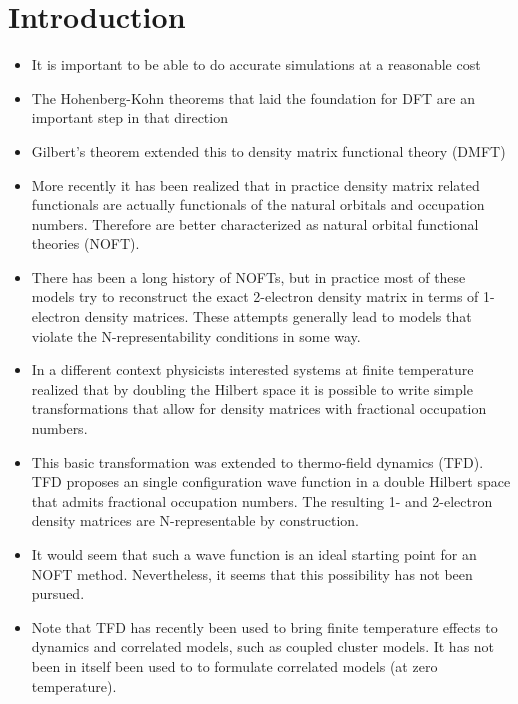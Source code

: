 \documentclass[aip,graphicx]{revtex4-1}
\begin{document}
\section{Introduction}
\label{intro}

\begin{itemize}
    \item It is important to be able to do accurate simulations at a reasonable cost
    \item The Hohenberg-Kohn\cite{Hohenberg_1964} theorems that laid the foundation for DFT are an important step in that direction
    \item Gilbert's theorem\cite{Gilbert_1975} extended this to density matrix functional theory (DMFT)
    \item More recently it has been realized that in practice density matrix related functionals are actually functionals of the natural orbitals and occupation numbers. Therefore are better characterized as natural orbital functional theories (NOFT)\cite{Goedecker_2000}.
    \item There has been a long history of NOFTs, but in practice most of these models try to reconstruct the exact 2-electron density matrix in terms of 1-electron density matrices. These attempts generally lead to models that violate the N-representability conditions in some way\cite{Herbert_2003}.
    \item In a different context physicists interested systems at finite temperature realized that by doubling the Hilbert space it is possible to write simple transformations that allow for density matrices with fractional occupation numbers\cite{Araki_1963}. 
    \item This basic transformation was extended to thermo-field dynamics (TFD)\cite{Takahashi_1975,Takahashi_1996}. TFD proposes an single configuration wave function in a double Hilbert space that admits fractional occupation numbers. The resulting 1- and 2-electron density matrices are N-representable by construction. 
    \item It would seem that such a wave function is an ideal starting point for an NOFT method. Nevertheless, it seems that this possibility has not been pursued. 
    \item Note that TFD has recently been used to bring finite temperature effects to dynamics\cite{Borrelli_2021} and correlated models, such as coupled cluster models\cite{Harsha_2019,Shushkov_2019,Nooijen_2021,Harsha_2022}. It has not been in itself been used to to formulate correlated models (at zero temperature). 

\end{itemize}
\end{document}
